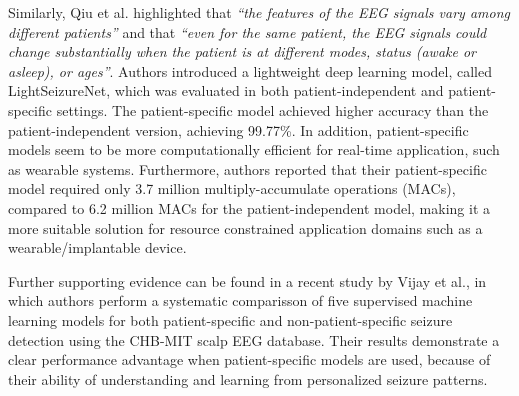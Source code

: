 \documentclass{article}
\begin{document}
				Similarly, Qiu et al.\cite{lightseizurenet} highlighted that \textit{“the features of the EEG signals 
				vary among different patients”} and that 
				\textit{“even for the same patient, the EEG signals could change substantially when the patient is 
				at different modes, status (awake or asleep), or ages”}.
				Authors introduced a lightweight deep learning model, called LightSeizureNet, 
				which was evaluated in both patient-independent and patient-specific settings. 
				The patient-specific model achieved higher accuracy than the patient-independent version, achieving 99.77\%. 
				In addition, patient-specific models seem to be more computationally efficient 
				for real-time application, such as wearable systems. 
				Furthermore, authors reported that their patient-specific model required only 3.7 million 
				multiply-accumulate operations (MACs), 
				compared to 6.2 million MACs for the patient-independent model, making it a more suitable solution for 
				resource constrained application domains
				such as a wearable/implantable device.
				
				Further supporting evidence can be found in a recent study by Vijay et al.\cite{vijay2025supervised}, 
				in which authors perform a systematic comparisson of five supervised machine learning models
				for both patient-specific and non-patient-specific seizure detection using the CHB-MIT scalp EEG database. 
				Their results demonstrate a clear performance advantage when patient-specific models are used, 
				because of their ability of understanding and learning from personalized seizure patterns. 


			\newpage




\end{document}
